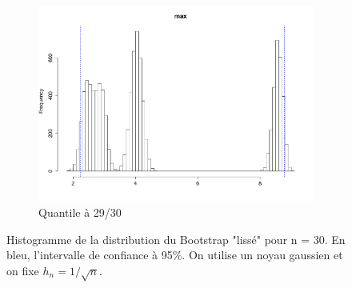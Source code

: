 \documentclass{article}
\renewcommand*{\(}{ \left( }
\renewcommand*{\)}{ \right) }
\begin{document}
\begin{figure}[H]
\begin{subfigure}[t]{0.3\textwidth}
        \includegraphics[width = \linewidth]{img/BootstrapSmooth-Max-30.pdf}
        \caption{Quantile à 29/30}
        \label{fig:smooth3BMax}
    \end{subfigure}%
    \caption{Histogramme de la distribution du Bootstrap "lissé" pour n = 30. En bleu, l'intervalle de confiance à 95\%. On utilise un noyau gaussien et on fixe $h_n =1/\sqrt{n}$.}
    \label{fig:smoothB30}
\end{figure}
\end{document}
